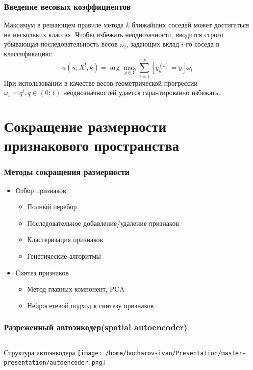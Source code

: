 \documentclass{beamer}
\begin{document}
\begin{frame}
\frametitle{Введение весовых коэффициентов}
Максимум в решающем правиле метода $k$ ближайших соседей может достигаться на нескольких классах. Чтобы избежать неоднозачности, вводится строго убывающая последовательность весов $\omega_i$, задающих вклад $i$-го соседа в классификацию:
$$a(u; X^l, k)=\arg\max\limits_{y \in Y}\sum\limits_{i=1}^{k}[y_u^{(i)}=y]\omega_i$$
При использовании в качестве весов геометрической прогрессии $\omega_i=q^i, q\in(0;1)$ неоднозначностей удается гарантированно избежать.
\end{frame} 

\section{Сокращение размерности признакового пространства}

\begin{frame}
\frametitle{Методы сокращения размерности}
\begin{itemize}
	\item{Отбор признаков}
		\begin{itemize}
		\item{Полный перебор}
		\item{Последовательное добавление/удаление признаков}
		\item{Кластеризация признаков}
		\item{Генетические алгоритмы}
		\end{itemize}
	\item{Синтез признаков}
		\begin{itemize}
		\item{Метод главных компонент, PCA}
		\item{Нейросетевой подход к синтезу признаков}
		\end{itemize}
\end{itemize}
\end{frame}

\begin{frame}
\frametitle{Разреженный автоэнкодер(spatial autoencoder)}
\begin{columns}[T]
    \begin{column}{.5\textwidth}
    \begin{block}{Структура автоэнкодера}
    \texttt{[image: /home/bocharov-ivan/Presentation/master-presentation/autoencoder.png]}
    \end{block}
    \end{column}
  \end{columns}
\end{frame}
\end{document}
